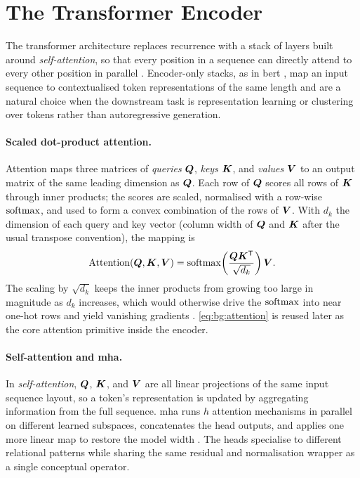 \section{The Transformer Encoder}\label{sec:bg:transformer}

The transformer architecture replaces recurrence with a stack of layers built around \emph{self-attention}, so that every position in a sequence can directly attend to every other position in parallel \parencite{vaswani2017attention}.
Encoder-only stacks, as in \gls{bert} \parencite{devlin2019bert}, map an input sequence to contextualised token representations of the same length and are a natural choice when the downstream task is representation learning or clustering over tokens rather than autoregressive generation.

\paragraph{Scaled dot-product attention.}
Attention maps three matrices of \emph{queries} $\bm{Q}$, \emph{keys} $\bm{K}$, and \emph{values} $\bm{V}$ to an output matrix of the same leading dimension as $\bm{Q}$.
Each row of $\bm{Q}$ scores all rows of $\bm{K}$ through inner products; the scores are scaled, normalised with a row-wise $\operatorname{softmax}$, and used to form a convex combination of the rows of $\bm{V}$.
With $d_k$ the dimension of each query and key vector (column width of $\bm{Q}$ and $\bm{K}$ after the usual transpose convention), the mapping is
\begin{equation}\label{eq:bg:attention}
  \mathrm{Attention}(\bm{Q}, \bm{K}, \bm{V})
  =
  \operatorname{softmax}\!\left(\frac{\bm{Q}\bm{K}^{\mathsf{T}}}{\sqrt{d_k}}\right)\bm{V}.
\end{equation}
The scaling by $\sqrt{d_k}$ keeps the inner products from growing too large in magnitude as $d_k$ increases, which would otherwise drive the $\operatorname{softmax}$ into near one-hot rows and yield vanishing gradients \parencite{vaswani2017attention}.
\cref{eq:bg:attention} is reused later as the core attention primitive inside the encoder.

\paragraph{Self-attention and \gls{mha}.}
In \emph{self-attention}, $\bm{Q}$, $\bm{K}$, and $\bm{V}$ are all linear projections of the same input sequence layout, so a token's representation is updated by aggregating information from the full sequence.
\Gls{mha} runs $h$ attention mechanisms in parallel on different learned subspaces, concatenates the head outputs, and applies one more linear map to restore the model width \parencite{vaswani2017attention}.
The heads specialise to different relational patterns while sharing the same residual and normalisation wrapper as a single conceptual operator.

